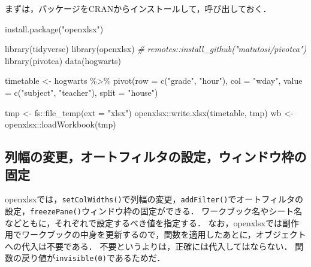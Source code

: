 \documentclass[
]{article}
\newenvironment{Shaded}{\begin{snugshade}}{\end{snugshade}}
\newcommand{\AttributeTok}[1]{\textcolor[rgb]{0.77,0.63,0.00}{#1}}
\newcommand{\CommentTok}[1]{\textcolor[rgb]{0.56,0.35,0.01}{\textit{#1}}}
\newcommand{\FunctionTok}[1]{\textcolor[rgb]{0.00,0.00,0.00}{#1}}
\newcommand{\NormalTok}[1]{#1}
\newcommand{\OtherTok}[1]{\textcolor[rgb]{0.56,0.35,0.01}{#1}}
\newcommand{\SpecialCharTok}[1]{\textcolor[rgb]{0.00,0.00,0.00}{#1}}
\newcommand{\StringTok}[1]{\textcolor[rgb]{0.31,0.60,0.02}{#1}}
\begin{document}
まずは，パッケージをCRANからインストールして，呼び出しておく．

\begin{Shaded}
\begin{Highlighting}[]
\FunctionTok{install.package}\NormalTok{(}\StringTok{"openxlsx"}\NormalTok{)}
\end{Highlighting}
\end{Shaded}

\begin{Shaded}
\begin{Highlighting}[]
\FunctionTok{library}\NormalTok{(tidyverse)}
\FunctionTok{library}\NormalTok{(openxlsx)}
  \CommentTok{\# remotes::install\_github("matutosi/pivotea")}
\FunctionTok{library}\NormalTok{(pivotea)}
\FunctionTok{data}\NormalTok{(hogwarts)}


\NormalTok{timetable }\OtherTok{\textless{}{-}} 
\NormalTok{  hogwarts }\SpecialCharTok{\%\textgreater{}\%}
  \FunctionTok{pivot}\NormalTok{(}\AttributeTok{row =} \FunctionTok{c}\NormalTok{(}\StringTok{"grade"}\NormalTok{, }\StringTok{"hour"}\NormalTok{), }\AttributeTok{col =} \StringTok{"wday"}\NormalTok{, }\AttributeTok{value =} \FunctionTok{c}\NormalTok{(}\StringTok{"subject"}\NormalTok{, }\StringTok{"teacher"}\NormalTok{), }\AttributeTok{split =} \StringTok{"house"}\NormalTok{)}


\NormalTok{tmp }\OtherTok{\textless{}{-}}\NormalTok{ fs}\SpecialCharTok{::}\FunctionTok{file\_temp}\NormalTok{(}\AttributeTok{ext =} \StringTok{"xlsx"}\NormalTok{)}
\NormalTok{openxlsx}\SpecialCharTok{::}\FunctionTok{write.xlsx}\NormalTok{(timetable, tmp)}
\NormalTok{wb }\OtherTok{\textless{}{-}}\NormalTok{ openxlsx}\SpecialCharTok{::}\FunctionTok{loadWorkbook}\NormalTok{(tmp)}
\end{Highlighting}
\end{Shaded}

\hypertarget{ux5217ux5e45ux306eux5909ux66f4ux30aaux30fcux30c8ux30d5ux30a3ux30ebux30bfux306eux8a2dux5b9aux30a6ux30a3ux30f3ux30c9ux30a6ux67a0ux306eux56faux5b9a}{%
\subsection{列幅の変更，オートフィルタの設定，ウィンドウ枠の固定}\label{ux5217ux5e45ux306eux5909ux66f4ux30aaux30fcux30c8ux30d5ux30a3ux30ebux30bfux306eux8a2dux5b9aux30a6ux30a3ux30f3ux30c9ux30a6ux67a0ux306eux56faux5b9a}}

openxlsxでは，\texttt{setColWidths()}で列幅の変更，\texttt{addFilter()}でオートフィルタの設定，\texttt{freezePane()}ウィンドウ枠の固定ができる．
ワークブック名やシート名などともに，それぞれで設定するべき値を指定する．
なお，openxlsxでは副作用でワークブックの中身を更新するので，関数を適用したあとに，オブジェクトへの代入は不要である．
不要というよりは，正確には代入してはならない．
関数の戻り値が\texttt{invisible(0)}であるためだ．
\end{document}
